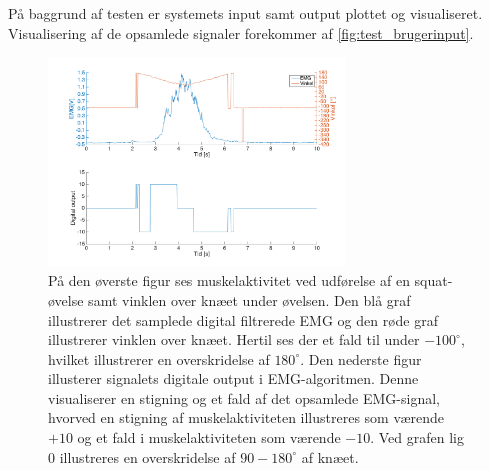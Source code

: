 På baggrund af testen er systemets input samt output plottet og visualiseret. Visualisering af de opsamlede signaler forekommer af \autoref{fig:test_brugerinput}. 
 
\begin{figure}[H]
\centering
\includegraphics[width=0.7\textwidth]{figures/test_brugerinput}
\caption{På den øverste figur ses muskelaktivitet ved udførelse af en squat-øvelse samt vinklen over knæet under øvelsen. Den blå graf illustrerer det samplede digital filtrerede EMG og den røde graf illustrerer vinklen over knæet. Hertil ses der et fald til under $-100^{\circ}$, hvilket illustrerer en overskridelse af $180^{\circ}$. Den nederste figur illusterer signalets digitale output i EMG-algoritmen. Denne visualiserer en stigning og et fald af det opsamlede EMG-signal, hvorved en stigning af muskelaktiviteten illustreres som værende $+10$ og et fald i muskelaktiviteten som værende $-10$. Ved grafen lig 0 illustreres en overskridelse af $90-180^{\circ}$ af knæet.}
\label{fig:test_brugerinput}
\end{figure}

